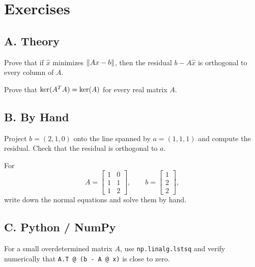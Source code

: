 \section*{Exercises}

\subsection*{A. Theory}

\begin{exercise}
Prove that if $\hat{x}$ minimizes $\left\lVert Ax-b \right\rVert$, then the residual
$b-A\hat{x}$ is orthogonal to every column of $A$.
\end{exercise}

\begin{exercise}
Prove that $\operatorname{ker}(A^TA)=\operatorname{ker}(A)$ for every real matrix $A$.
\end{exercise}

\subsection*{B. By Hand}

\begin{exercise}
Project $b=(2,1,0)$ onto the line spanned by $a=(1,1,1)$ and compute the
residual. Check that the residual is orthogonal to $a$.
\end{exercise}

\begin{exercise}
For
\[
  A=\begin{bmatrix}1&0\\1&1\\1&2\end{bmatrix},
  \qquad
  b=\begin{bmatrix}1\\2\\2\end{bmatrix},
\]
write down the normal equations and solve them by hand.
\end{exercise}

\subsection*{C. Python / NumPy}

\begin{exercise}
For a small overdetermined matrix $A$, use \texttt{np.linalg.lstsq} and verify
numerically that \texttt{A.T @ (b - A @ x)} is close to zero.
\end{exercise}

